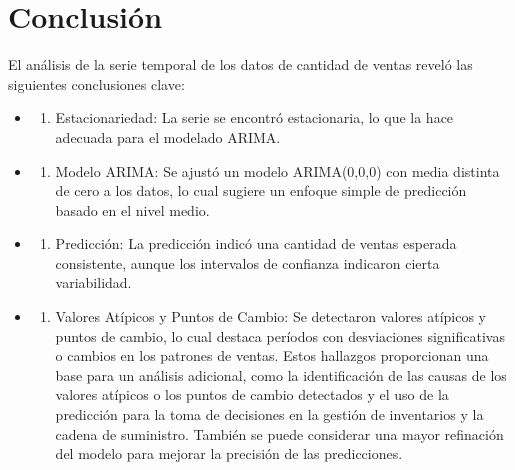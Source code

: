 \documentclass[
]{book}
\providecommand{\tightlist}{%
  \setlength{\itemsep}{0pt}\setlength{\parskip}{0pt}}
\begin{document}
\section{Conclusión}\label{conclusiuxf3n-1}

El análisis de la serie temporal de los datos de cantidad de ventas reveló las siguientes conclusiones clave:

\begin{itemize}
\tightlist
\item
  \begin{enumerate}
  \def\labelenumi{\arabic{enumi}.}
  \tightlist
  \item
    Estacionariedad: La serie se encontró estacionaria, lo que la hace adecuada para el modelado ARIMA.
  \end{enumerate}
\item
  \begin{enumerate}
  \def\labelenumi{\arabic{enumi}.}
  \setcounter{enumi}{1}
  \tightlist
  \item
    Modelo ARIMA: Se ajustó un modelo ARIMA(0,0,0) con media distinta de cero a los datos, lo cual sugiere un enfoque simple de predicción basado en el nivel medio.
  \end{enumerate}
\item
  \begin{enumerate}
  \def\labelenumi{\arabic{enumi}.}
  \setcounter{enumi}{2}
  \tightlist
  \item
    Predicción: La predicción indicó una cantidad de ventas esperada consistente, aunque los intervalos de confianza indicaron cierta variabilidad.
  \end{enumerate}
\item
  \begin{enumerate}
  \def\labelenumi{\arabic{enumi}.}
  \setcounter{enumi}{3}
  \tightlist
  \item
    Valores Atípicos y Puntos de Cambio: Se detectaron valores atípicos y puntos de cambio, lo cual destaca períodos con desviaciones significativas o cambios en los patrones de ventas.
    Estos hallazgos proporcionan una base para un análisis adicional, como la identificación de las causas de los valores atípicos o los puntos de cambio detectados y el uso de la predicción para la toma de decisiones en la gestión de inventarios y la cadena de suministro. También se puede considerar una mayor refinación del modelo para mejorar la precisión de las predicciones.
  \end{enumerate}
\end{itemize}
\end{document}
